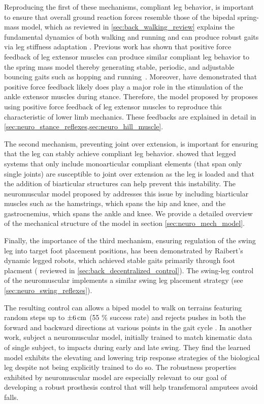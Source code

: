 Reproducing the first of these mechanisms, compliant leg behavior, is important
to ensure that overall ground reaction forces resemble those of the bipedal
spring-mass model, which as reviewed in \cref{sec:back_walking_review} explains
the fundamental dynamics of both walking and running \citep{geyer2006compliant}
and can produce robust gaits via leg stiffness adaptation
\citep{visser2012robust}. Previous work has shown that positive force feedback
of leg extensor muscles can produce similar compliant leg behavior to the spring
mass model thereby generating stable, periodic, and adjustable bouncing gaits
such as hopping and running~\citep{geyer2003positive}. Moreover,
\citet{grey2007positive} have demonstrated that positive force feedback likely
does play a major role in the stimulation of the ankle extensor muscles during
stance. Therefore, the model proposed by
\citeauthor{geyer2010muscle,song2015neural} proposes using positive force
feedback of leg extensor muscles to reproduce this characteristic of lower limb
mechanics. These feedbacks are explained in detail in
\cref{sec:neuro_stance_reflexes,sec:neuro_hill_muscle}.

The second mechanism, preventing joint over extension, is important for ensuring
that the leg can stably achieve compliant leg behavior.
\citet{seyfarth2001stable} showed that legged systems that only include
monoarticular compliant elements (that span only single joints) are susceptible
to joint over extension as the leg is loaded and that the addition of
biarticular structures can help prevent this instability. The neuromuscular
model proposed by \citet{geyer2010muscle,song2015neural} addresses this issue by
including biarticular muscles such as the hamstrings, which spans the hip and
knee, and the gastrocnemius, which spans the ankle and knee. We provide a
detailed overview of the mechanical structure of the model in section
\cref{sec:neuro_mech_model}.

Finally, the importance of the third mechanism, ensuring regulation of the swing
leg into target foot placement positions, has been demonstrated by Raibert's
dynamic legged robots, which achieved stable gaits primarily through foot
placment (\citep{raibert1983dynamically,raibert1986legged} reviewed in
\cref{sec:back_decentralized_control}). The swing-leg control of the
neuromuscular implements a similar swing leg placement strategy (see
\cref{sec:neuro_swing_reflexes}).

The resulting control can allows a biped model to walk on terrains featuring
random steps up to $\unit[\pm 6]{cm}$ (55 \% success rate) and rejects pushes in
both the forward and backward directions at various points in the gait cycle
\citep{song2015neural}. In another work, \citet{murai2011neuromuscular} subject
a neuromuscular model, initially trained to match kinematic data of single
subject, to impacts during early and late swing. They find the learned model
exhibits the elevating and lowering trip response strategies of the biological
leg despite not being explicitly trained to do so. The robustness properties
exhibited by neuromuscular model are especially relevant to our goal of
developing a robust prosthesis control that will help transfemoral amputees
avoid falls. 

